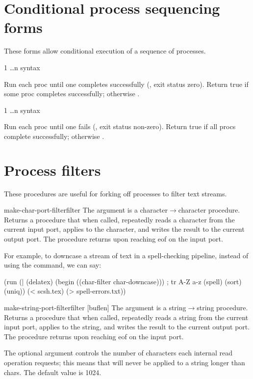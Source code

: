 \section{Conditional process sequencing forms}
These forms allow conditional execution of a sequence of processes.

\dfn{||} {1 \ldots {}n} {\boolean} {syntax}
\begin{desc}    
    Run each proc until one completes successfully (\ie, exit status zero).
    Return true if some proc completes successfully; otherwise \sharpf.
\end{desc}

\dfn{\&\&} {1 \ldots {}n} {\boolean} {syntax}
\begin{desc}    
    Run each proc until one fails (\ie, exit status non-zero).
    Return true if all procs complete successfully; otherwise \sharpf.
\end{desc}

\section{Process filters}

These procedures are useful for forking off processes to filter
text streams.

\begin{defundesc}{make-char-port-filter}{filter}{\proc}
    The  argument is a character$\rightarrow$character procedure.
    Returns a procedure that when called, repeatedly reads a character
    from the current input port, applies  to the character,
    and writes the result to the current output port.
    The procedure returns upon reaching eof on the input port.

    For example, to downcase a stream of text in a spell-checking pipeline, 
    instead of using the {\Unix}  command, we can say:
\begin{code}
(run (| (delatex)
        (begin ((char-filter char-downcase))) ; tr A-Z a-z
        (spell)
        (sort)
        (uniq))
     (< scsh.tex)
     (> spell-errors.txt))\end{code}
\end{defundesc}

\begin{defundesc}{make-string-port-filter}{filter [buflen]}{\proc}
    The  argument is a string$\rightarrow$string procedure.
    Returns a procedure that when called, repeatedly reads a string
    from the current input port, applies  to the string,
    and writes the result to the current output port.
    The procedure returns upon reaching eof on the input port.

    The optional  argument controls the number of characters
    each internal read operation requests; this means that 
    will never be applied to a string longer than  chars.
    The default  value is 1024.
\end{defundesc}
